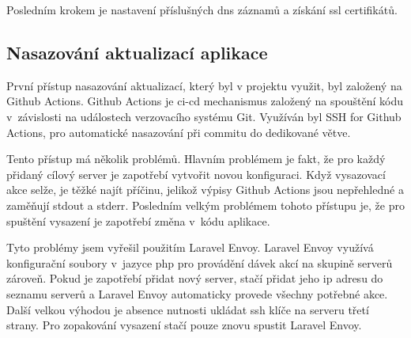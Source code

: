 Posledním krokem je nastavení příslušných \acrshort{dns} záznamů a získání \acrshort{ssl} certifikátů.

\subsection{Nasazování aktualizací aplikace}
\label{sub:update-deployment}

První přístup nasazování aktualizací, který byl v projektu \bso{} využit, byl založený na Github Actions\cite{github-actions}.
Github Actions je \gls{ci-cd} mechanismus založený na spouštění kódu v~závislosti na událostech verzovacího systému Git\cite{git}. Využíván byl SSH for Github Actions\cite{ssh-for-github-actions}, pro automatické nasazování při commitu do dedikované větve.

Tento přístup má několik problémů. Hlavním problémem je fakt, že pro každý přidaný cílový server je zapotřebí vytvořit novou konfiguraci. Když vysazovací akce selže, je těžké najít příčinu, jelikož výpisy Github Actions jsou nepřehledné a zaměňují \acrshort{stdout} a \acrshort{stderr}. Posledním velkým problémem tohoto přístupu je, že pro spuštění vysazení je zapotřebí změna v~kódu aplikace.

Tyto problémy jsem vyřešil použitím Laravel Envoy\cite{laravel-envoy}. Laravel Envoy využívá konfigurační soubory v~jazyce \acrshort{php} pro provádění dávek akcí na skupině serverů zároveň. Pokud je zapotřebí přidat nový server, stačí přidat jeho \acrshort{ip} adresu do seznamu serverů a Laravel Envoy automaticky provede všechny potřebné akce. Další velkou výhodou je absence nutnosti ukládat \acrshort{ssh} klíče na serveru třetí strany. Pro zopakování vysazení stačí pouze znovu spustit Laravel Envoy.
